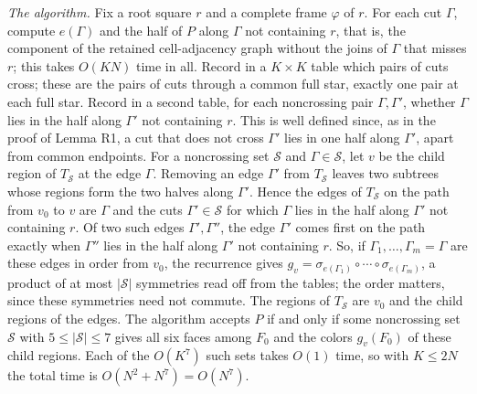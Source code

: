 \documentclass[
  11pt,
]{article}
\begin{document}
\emph{The algorithm.} Fix a root square \(r\) and a complete frame
\(\varphi\) of \(r\). For each cut \(\Gamma\), compute \(e(\Gamma)\) and
the half of \(P\) along \(\Gamma\) not containing \(r\), that is, the
component of the retained cell-adjacency graph without the joins of
\(\Gamma\) that misses \(r\); this takes \(O(KN)\) time in all. Record
in a \(K\times K\) table which pairs of cuts cross; these are the pairs
of cuts through a common full star, exactly one pair at each full star.
Record in a second table, for each noncrossing pair \(\Gamma,\Gamma'\),
whether \(\Gamma\) lies in the half along \(\Gamma'\) not containing
\(r\). This is well defined since, as in the proof of Lemma R1, a cut
that does not cross \(\Gamma'\) lies in one half along \(\Gamma'\),
apart from common endpoints. For a noncrossing set \(\mathcal S\) and
\(\Gamma\in\mathcal S\), let \(v\) be the child region of
\(T_{\mathcal S}\) at the edge \(\Gamma\). Removing an edge \(\Gamma'\)
from \(T_{\mathcal S}\) leaves two subtrees whose regions form the two
halves along \(\Gamma'\). Hence the edges of \(T_{\mathcal S}\) on the
path from \(v_0\) to \(v\) are \(\Gamma\) and the cuts
\(\Gamma'\in\mathcal S\) for which \(\Gamma\) lies in the half along
\(\Gamma'\) not containing \(r\). Of two such edges
\(\Gamma',\Gamma''\), the edge \(\Gamma'\) comes first on the path
exactly when \(\Gamma''\) lies in the half along \(\Gamma'\) not
containing \(r\). So, if \(\Gamma_1,\ldots,\Gamma_m=\Gamma\) are these
edges in order from \(v_0\), the recurrence gives
\(g_v=\sigma_{e(\Gamma_1)}\circ\cdots\circ\sigma_{e(\Gamma_m)}\), a
product of at most \(\left|\mathcal S\right|\) symmetries read off from
the tables; the order matters, since these symmetries need not commute.
The regions of \(T_{\mathcal S}\) are \(v_0\) and the child regions of
the edges. The algorithm accepts \(P\) if and only if some noncrossing
set \(\mathcal S\) with \(5\le\left|\mathcal S\right|\le7\) gives all
six faces among \(F_0\) and the colors \(g_v(F_0)\) of these child
regions. Each of the \(O(K^7)\) such sets takes \(O(1)\) time, so with
\(K\le 2N\) the total time is \(O(N^2+N^7)=O(N^7)\).
\end{document}
